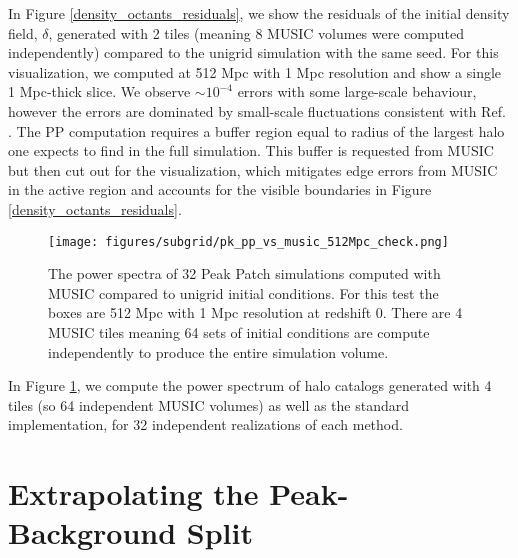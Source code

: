 In Figure \ref{density_octants_residuals}, we show the residuals of the initial density field, $\delta$, generated with 2 tiles (meaning 8 MUSIC volumes were computed independently) compared to the unigrid simulation with the same seed. For this visualization, we computed at 512 Mpc with 1 Mpc resolution and show a single 1 Mpc-thick slice. We observe $\sim 10^{-4}$ errors with some large-scale behaviour, however the errors are dominated by small-scale fluctuations consistent with Ref. \cite{music}. The PP computation requires a buffer region equal to radius of the largest halo one expects to find in the full simulation. This buffer is requested from MUSIC but then cut out for the visualization, which mitigates edge errors from MUSIC in the active region and accounts for the visible boundaries in Figure \ref{density_octants_residuals}.

\begin{figure}[h!] %
\begin{center}
\texttt{[image: figures/subgrid/pk\_pp\_vs\_music\_512Mpc\_check.png]}%
\caption{The power spectra of 32 Peak Patch simulations computed with MUSIC compared to unigrid initial conditions. For this test the boxes are 512 Mpc with 1 Mpc resolution at redshift 0. There are 4 MUSIC tiles meaning 64 sets of initial conditions are compute independently to produce the entire simulation volume.}
\label{pkcheck}
\end{center}
\end{figure}

In Figure \ref{pkcheck}, we compute the power spectrum of halo catalogs generated with 4 tiles (so 64 independent MUSIC volumes) as well as the standard implementation, for 32 independent realizations of each method.

\section{Extrapolating the Peak-Background Split}
\label{ch:signal:sec:gppbs}

